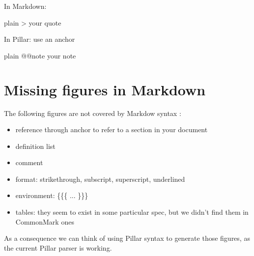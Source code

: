 \documentclass[10pt,twoside,english]{_support/latex/sbabook/sbabook}
\begin{document}
In Markdown:

\begin{displaycode}{plain}
> your quote
\end{displaycode}

In Pillar: use an anchor

\begin{displaycode}{plain}
@@note your note
\end{displaycode}
\chapter{Missing figures in Markdown}
The following figures are not covered by Markdow syntax :

\begin{itemize}
\item reference through anchor to refer to a section in your document
\item definition list
\item comment
\item format: strikethrough, subscript, superscript, underlined
\item environment: \{\{\{ ... \}\}\}
\item tables: they seem to exist in some particular spec, but we didn't find them in CommonMark ones
\end{itemize}

As a consequence we can think of using Pillar syntax to generate those figures, as the current Pillar parser is working.






\backmatter

\end{document}
